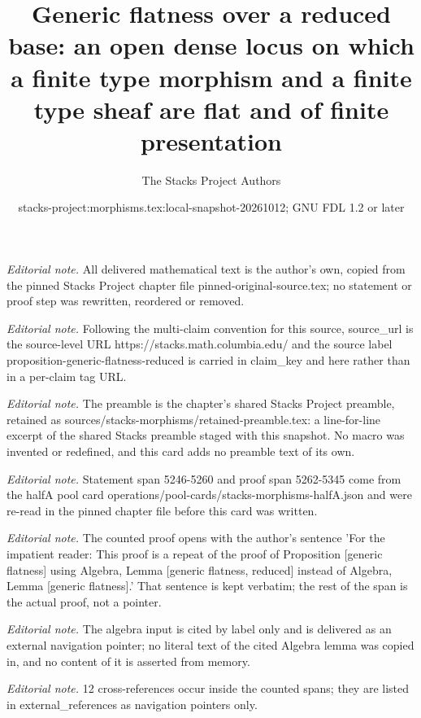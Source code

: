 \documentclass[10pt,a4paper]{amsart}
\title{Generic flatness over a reduced base: an open dense locus on which a finite type morphism and a finite type sheaf are flat and of finite presentation}
\author{The Stacks Project Authors}
\date{stacks-project:morphisms.tex:local-snapshot-20261012; GNU FDL 1.2 or later}
\theoremstyle{plain}
\theoremstyle{definition}
\theoremstyle{remark}
\numberwithin{equation}{subsection}
\begin{document}
\maketitle
\noindent\textit{Editorial note.} All delivered mathematical text is the author's own, copied from the pinned Stacks Project chapter file pinned-original-source.tex; no statement or proof step was rewritten, reordered or removed.\par\medskip
\noindent\textit{Editorial note.} Following the multi-claim convention for this source, source\_url is the source-level URL https://stacks.math.columbia.edu/ and the source label proposition-generic-flatness-reduced is carried in claim\_key and here rather than in a per-claim tag URL.\par\medskip
\noindent\textit{Editorial note.} The preamble is the chapter's shared Stacks Project preamble, retained as sources/stacks-morphisms/retained-preamble.tex: a line-for-line excerpt of the shared Stacks preamble staged with this snapshot. No macro was invented or redefined, and this card adds no preamble text of its own.\par\medskip
\noindent\textit{Editorial note.} Statement span 5246-5260 and proof span 5262-5345 come from the halfA pool card operations/pool-cards/stacks-morphisms-halfA.json and were re-read in the pinned chapter file before this card was written.\par\medskip
\noindent\textit{Editorial note.} The counted proof opens with the author's sentence 'For the impatient reader: This proof is a repeat of the proof of Proposition [generic flatness] using Algebra, Lemma [generic flatness, reduced] instead of Algebra, Lemma [generic flatness].' That sentence is kept verbatim; the rest of the span is the actual proof, not a pointer.\par\medskip
\noindent\textit{Editorial note.} The algebra input is cited by label only and is delivered as an external navigation pointer; no literal text of the cited Algebra lemma was copied in, and no content of it is asserted from memory.\par\medskip
\noindent\textit{Editorial note.} 12 cross-references occur inside the counted spans; they are listed in external\_references as navigation pointers only.\par\medskip
\end{document}
